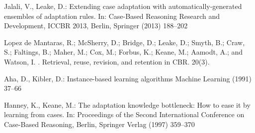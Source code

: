 %
%
%
%


\begin{thebibliography}{999}

	Jalali, V., Leake, D.:
	\newblock Extending case adaptation with automatically-generated ensembles of
	  adaptation rules.
	\newblock In: Case-Based Reasoning Research and Development, \uppercase{ICCBR}
	  2013, Berlin, Springer (2013)  188--202

	{Lopez de Mantaras}, R.; McSherry, D.; Bridge, D.; Leake, D.; Smyth,
	  B.; Craw, S.; Faltings, B.; Maher, M.; Cox, M.; Forbus, K.; Keane, M.;
	  Aamodt, A.; and Watson, I.
	.
	\newblock Retrieval, reuse, revision, and retention in \uppercase{CBR}.
	 20(3).

	Aha, D., Kibler, D.:
	\newblock Instance-based learning algorithms
	\newblock Machine Learning (1991) 37--66

	Hanney, K., Keane, M.:
	\newblock The adaptation knowledge bottleneck: How to ease it by learning from
	  cases.
	\newblock In: Proceedings of the Second International Conference on Case-Based
	  Reasoning, Berlin, Springer Verlag (1997)  359--370

\end{thebibliography}
